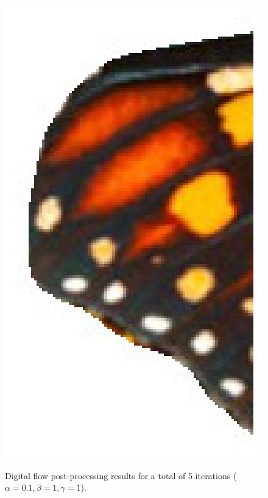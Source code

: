 \documentclass[runningheads]{llncs}
\begin{document}
\begin{figure}[!ht]
\begin{minipage}[b]{0.5\textwidth}
{		\includegraphics[scale=0.5]{images/butterfly/cor-mark-1.eps}
		}	
		\end{minipage}%
		\begin{minipage}[b]{0.6\textwidth}
		\center
		
		\end{minipage}
				

		\caption{Digital flow post-processing results for a total of 5 iterations ($\alpha=0.1, \beta=1,\gamma=1$). }
		\label{fig:butterfly_results}
	\end{figure}%


%
%
%


\end{document}
